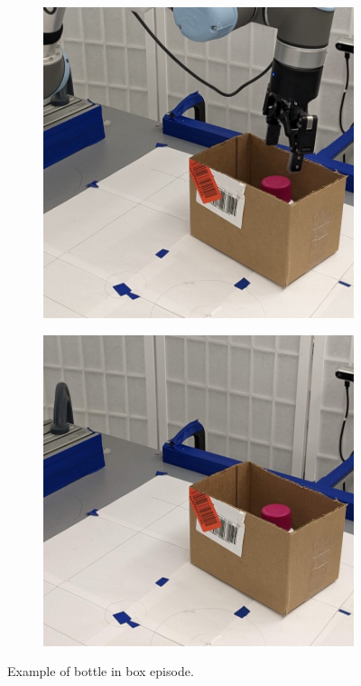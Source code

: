 \documentclass{article}
\begin{document}
\begin{figure}[]
\begin{subfigure}{(\linewidth - 0.05\linewidth)/5}
    \end{subfigure}
    \begin{subfigure}{(\linewidth - 0.05\linewidth)/5}
        \centering
        \includegraphics[width=\linewidth]{figures/episodes/bottle_in_box/2.jpg}
    \end{subfigure}
    \begin{subfigure}{(\linewidth - 0.05\linewidth)/5}
        \centering
        \includegraphics[width=\linewidth]{figures/episodes/bottle_in_box/1.jpg}
    \end{subfigure}

    \caption{Example of bottle in box episode.}
    \label{fig:bottle_in_box_episode}
\end{figure}
\end{document}

